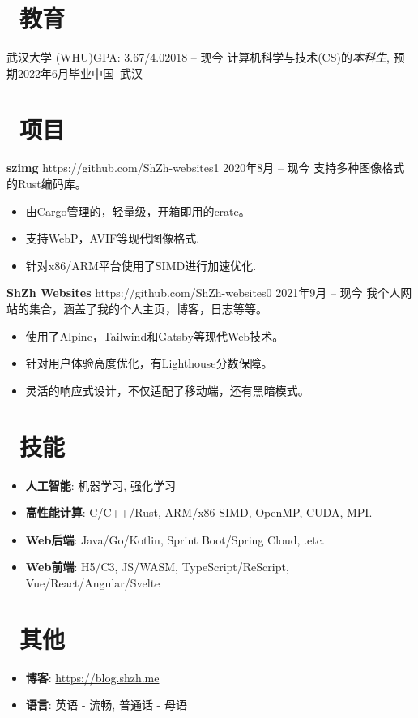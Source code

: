 \documentclass{common}
\begin{document}

\section{\faGraduationCap\ 教育}
\educationsubsection
    {武汉大学 (WHU)}{GPA: 3.67/4.0}{2018 -- 现今}
    {计算机科学与技术(CS)的\textit{本科生}, 预期2022年6月毕业}{中国\ 武汉}

\section{\faCubes\ 项目}
\projectsubsection
    {\textbf{szimg}}
    {https://github.com/ShZh-websites}{1}
    {2020年8月 -- 现今}
支持多种图像格式的Rust编码库。
\begin{itemize}
    \item 由Cargo管理的，轻量级，开箱即用的crate。
    \item 支持WebP，AVIF等现代图像格式.
    \item 针对x86/ARM平台使用了SIMD进行加速优化.
\end{itemize}
\projectsubsection
    {\textbf{ShZh Websites}}
    {https://github.com/ShZh-websites}{0}
    {2021年9月 -- 现今}
我个人网站的集合，涵盖了我的个人主页，博客，日志等等。
\begin{itemize}
    \item 使用了Alpine，Tailwind和Gatsby等现代Web技术。
    \item 针对用户体验高度优化，有Lighthouse分数保障。
    \item 灵活的响应式设计，不仅适配了移动端，还有黑暗模式。
\end{itemize}

\section{\faCogs\ 技能}
\begin{itemize}[parsep=0.5ex]
    \item \textbf{人工智能}: 机器学习, 强化学习
    \item \textbf{高性能计算}: C/C++/Rust, ARM/x86 SIMD, OpenMP, CUDA, MPI.
    \item \textbf{Web后端}: Java/Go/Kotlin, Sprint Boot/Spring Cloud, .etc.
    \item \textbf{Web前端}: H5/C3, JS/WASM, TypeScript/ReScript, Vue/React/Angular/Svelte
\end{itemize}

\section{\faInfo\ 其他}
\begin{itemize}[parsep=0.5ex]
    \item \textbf{博客}: \href{https://blog.shzh.me}{https://blog.shzh.me}
    \item \textbf{语言}: 英语 - 流畅, 普通话 - 母语
\end{itemize}
\end{document}
